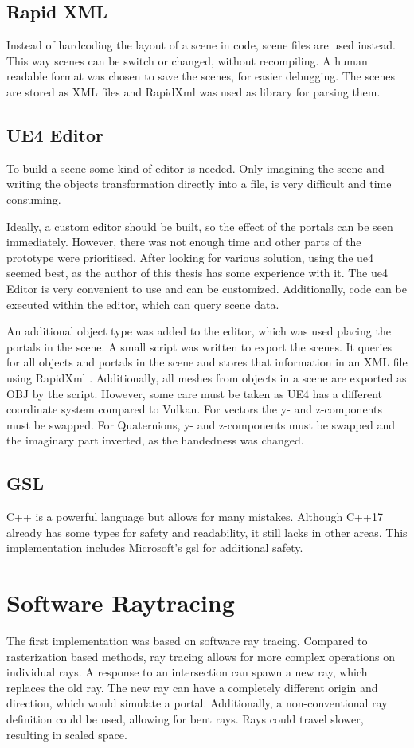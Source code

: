 \subsection{Rapid XML}
Instead of hardcoding the layout of a scene in code, scene files are used instead. This way scenes can be switch or changed, without recompiling. A human readable format was chosen to save the scenes, for easier debugging. The scenes are stored as XML files and RapidXml \cite{rapidxml} was used as library for parsing them.

\subsection{UE4 Editor}
To build a scene some kind of editor is needed. Only imagining the scene and writing the objects transformation directly into a file, is very difficult and time consuming.

Ideally, a custom editor should be built, so the effect of the portals can be seen immediately. However, there was not enough time and other parts of the prototype were prioritised. After looking for various solution, using the \gls{ue4} \cite{ue4} seemed best, as the author of this thesis has some experience with it. The \gls{ue4} Editor is very convenient to use and can be customized. Additionally, code can be executed within the editor, which can query scene data.

An additional object type was added to the editor, which was used placing the portals in the scene. A small script was written to export the scenes. It queries for all objects and portals in the scene and stores that information in an XML file using RapidXml \cite{rapidxml}. Additionally, all meshes from objects in a scene are exported as OBJ by the script. However, some care must be taken as UE4 has a different coordinate system compared to Vulkan. For vectors the y- and z-components must be swapped. For Quaternions, y- and z-components must be swapped and the imaginary part inverted, as the handedness was changed.

\subsection{GSL}
C++ is a powerful language but allows for many mistakes. Although C++17 already has some types for safety and readability, it still lacks in other areas. This implementation includes Microsoft's \gls{gsl} \cite{microsoft:gsl} for additional safety.


\section{Software Raytracing}
The first implementation was based on software ray tracing. Compared to rasterization based methods, ray tracing allows for more complex operations on individual rays. A response to an intersection can spawn a new ray, which replaces the old ray. The new ray can have a completely different origin and direction, which would simulate a portal. Additionally, a non-conventional ray definition could be used, allowing for bent rays. Rays could travel slower, resulting in scaled space.

